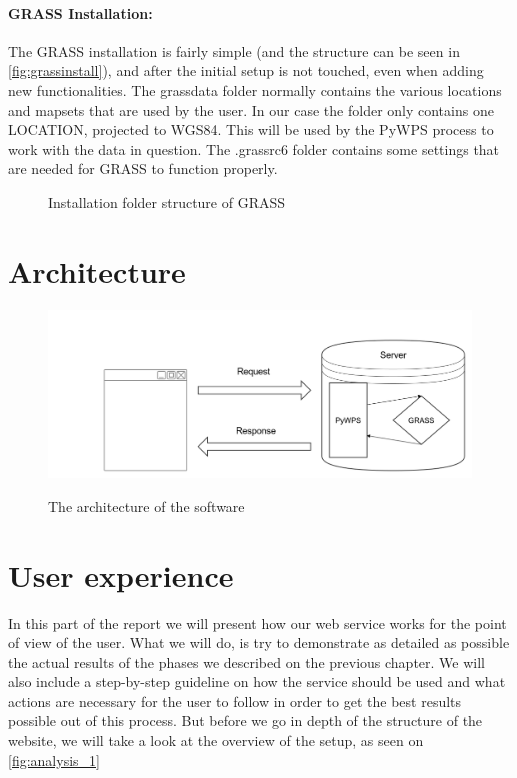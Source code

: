 \paragraph{GRASS Installation:}The GRASS installation is fairly simple (and the structure can be seen in \autoref{fig:grassinstall}), and after the initial setup is not touched, even when adding new functionalities. The grassdata folder normally contains the various locations and mapsets that are used by the user. In our case the folder only contains one LOCATION, projected to WGS84. This will be used by the PyWPS process to work with the data in question. 
The .grassrc6 folder contains some settings that are needed for GRASS to function properly.

\begin{figure}[h]
\caption{Installation folder structure of GRASS}
\label{fig:grassinstall}
\end{figure}


\section{Architecture}
\begin{figure}[h!]
\centering
	{\includegraphics[width=\linewidth]{gfx/Analysis_Architecture/grass_pywps.png}}
\caption{The architecture of the software}
\label{fig:grass_archi}
\end{figure}


\section{User experience}
In this part of the report we will present  how our web service works for the point of view of the user. What we will do, is try to demonstrate as detailed as possible the actual results of the phases we described on the previous chapter. We will also include a step-by-step guideline on how the service should be used and what actions are necessary for the user to follow in order to get the best results possible out of this process. But before we go in depth of the structure of the website, we will take a look at the overview of the setup, as seen on \autoref{fig:analysis_1}

